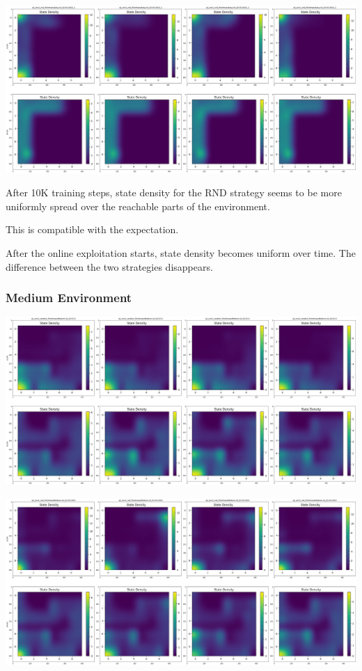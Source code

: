 \documentclass[11pt]{article}
\begin{document}
    \hspace*{-0.6in}
    \includegraphics[scale=0.20]{p1/q1-easy-state-density-rnd}

    After 10K training steps, state density for the RND strategy seems to be more uniformly spread over the reachable parts of the environment.

    This is compatible with the expectation.

    After the online exploitation starts, state density becomes uniform over time.
    The difference between the two strategies disappears.

    \subsubsection{Medium Environment}

    \hspace*{-0.3in}
    \includegraphics[scale=0.20]{p1/q1-medium-state-density-random}

    \hspace*{-0.6in}
    \includegraphics[scale=0.20]{p1/q1-medium-state-density-rnd}
\end{document}
